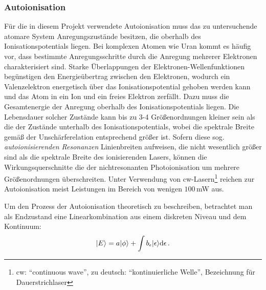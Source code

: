 \subsubsection{Autoionisation}\label{subsubsec:autoionisation}
Für die in diesem Projekt verwendete Autoionisation muss das zu untersuchende
atomare System Anregungszustände besitzen, die oberhalb des
Ionisationspotentials liegen.
Bei komplexen Atomen wie Uran kommt es häufig vor, dass bestimmte Anregungsschritte durch die
Anregung mehrerer Elektronen charakterisiert sind.
Starke Überlappungen der Elektronen-Wellenfunktionen begünstigen den
Energieübertrag zwischen den Elektronen, wodurch ein Valenzelektron energetisch über das Ionisationspotential
gehoben werden kann und das Atom in ein Ion und ein freies Elektron zerfällt.
Dazu muss die Gesamtenergie der Anregung oberhalb des Ionisationspotentials
liegen.
Die Lebensdauer solcher Zustände kann bis zu 3-4 Größenordnungen kleiner sein
als die der Zustände unterhalb des Ionisationspotentials, wobei die spektrale
Breite gemäß der Unschärferelation entsprechend größer ist.
Sofern diese sog. \textit{autoionisierenden Resonanzen} Linienbreiten aufweisen,
die nicht wesentlich größer sind als die spektrale Breite des ionisierenden
Lasers, können die Wirkungsquerschnitte die der nichtresonanten Photoionisation
um mehrere Größenordnungen überschreiten. Unter Verwendung von
cw-Lasern\footnote{cw: "`continuous wave"', zu deutsch: "`kontinuierliche
Welle"', Bezeichnung für Dauerstrichlaser} reichen zur Autoionisation meist
Leistungen im Bereich von wenigen $100\,$mW aus.\par
Um den Prozess der Autoionisation theoretisch zu beschreiben, betrachtet man als
Endzustand eine Linearkombination aus einem diskreten Niveau und dem Kontinuum:
\begin{equation}\label{eq:uebergang_diskret_kontinuum}
	|{E}\rangle=a|{\phi}\rangle+\int b_\epsilon|{\epsilon}\rangle\mathrm{d}\epsilon\,.
\end{equation}
